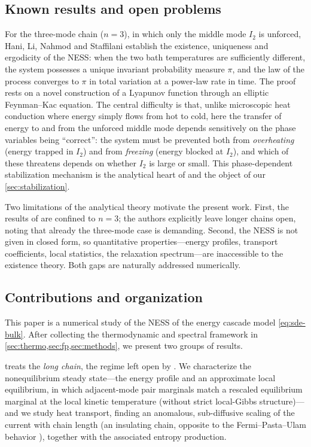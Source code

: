 \documentclass[11pt,a4paper]{article}
\theoremstyle{definition}
\numberwithin{equation}{section}   %
\begin{document}
\subsection{Known results and open problems}\label{sec:known}

For the three-mode chain ($n=3$), in which only the middle mode $I_2$ is
unforced, Hani, Li, Nahmod and Staffilani \cite{HLNS} establish the existence,
uniqueness and ergodicity of the NESS: when the two bath temperatures are
sufficiently different, the system possesses a unique invariant probability
measure $\pi$, and the law of the process converges to $\pi$ in total variation
at a power-law rate in time. The proof rests on a novel construction of a
Lyapunov function through an elliptic Feynman--Kac equation. The central
difficulty is that, unlike microscopic heat conduction where energy simply flows
from hot to cold, here the transfer of energy to and from the unforced middle
mode depends sensitively on the phase variables being ``correct'': the system
must be prevented both from \emph{overheating} (energy trapped in $I_2$) and from
\emph{freezing} (energy blocked at $I_2$), and which of these threatens depends on
whether $I_2$ is large or small. This phase-dependent stabilization mechanism is
the analytical heart of \cite{HLNS} and the object of our \cref{sec:stabilization}.

Two limitations of the analytical theory motivate the present work. First, the
results of \cite{HLNS} are confined to $n=3$; the authors explicitly leave longer
chains open, noting that already the three-mode case is demanding. Second, the
NESS is not given in closed form, so quantitative properties---energy profiles,
transport coefficients, local statistics, the relaxation spectrum---are
inaccessible to the existence theory. Both gaps are naturally addressed
numerically.

\subsection{Contributions and organization}\label{sec:contributions}

This paper is a numerical study of the NESS of the energy cascade model
\eqref{eq:sde-bulk}. After collecting the thermodynamic and spectral framework in
\cref{sec:thermo,sec:fp,sec:methods}, we present two groups of results.

 treats the \emph{long chain}, the regime left open by
\cite{HLNS}. We characterize the nonequilibrium steady state---the energy profile
and an approximate local equilibrium, in which adjacent-mode pair marginals match a rescaled equilibrium marginal at the local kinetic temperature (without strict local-Gibbs structure)---
and we study heat transport, finding an anomalous, sub-diffusive scaling of the
current with chain length (an insulating chain, opposite to the
Fermi--Pasta--Ulam behavior \cite{LepriLiviPoliti}), together with the
associated entropy production.
\end{document}
